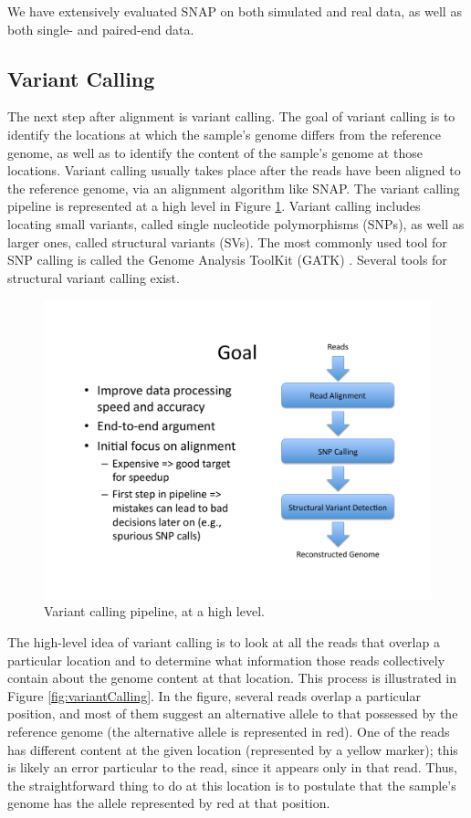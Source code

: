 \documentclass[twocolumn,10pt]{article}
\begin{document}
We have extensively evaluated SNAP on both simulated and real data, as well as both single- and paired-end data.

\subsection{Variant Calling}

The next step after alignment is variant calling.  The goal of variant calling is to identify the locations at which the sample's genome differs from the reference genome, as well as to identify the content of the sample's genome at those locations.  Variant calling usually takes place after the reads have been aligned to the reference genome, via an alignment algorithm like SNAP.  The variant calling pipeline is represented at a high level in Figure \ref{fig:pipeline}.  Variant calling includes locating small variants, called single nucleotide polymorphisms (SNPs), as well as larger ones, called structural variants (SVs).  The most commonly used tool for SNP calling is called the Genome Analysis ToolKit (GATK) \cite{DePristo:2011}.  Several tools for structural variant calling exist.

\begin{figure}
\centering
\includegraphics[scale=0.6]{pipeline.pdf}
\caption{Variant calling pipeline, at a high level.}
\label{fig:pipeline}
\end{figure}

The high-level idea of variant calling is to look at all the reads that overlap a particular location and to determine what information those reads collectively contain about the genome content at that location.  This process is illustrated in Figure \ref{fig:variantCalling}.  In the figure, several reads overlap a particular position, and most of them suggest an alternative allele to that possessed by the reference genome (the alternative allele is represented in red).  One of the reads has different content at the given location (represented by a yellow marker); this is likely an error particular to the read, since it appears only in that read.  Thus, the straightforward thing to do at this location is to postulate that the sample's genome has the allele represented by red at that position.
\end{document}
